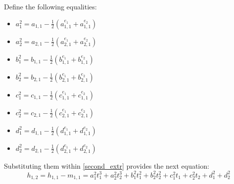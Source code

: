 Define the following equalities:

\begin{multicols}{2}
\begin{itemize}
\item $a_1^2 = a_{1,1} - \frac{1}{2} \left( a_{1,1}^{e_1} + a_{1,1}^{e_2}  \right)$
\item $a_2^2 = a_{2,1} - \frac{1}{2} \left( a_{2,1}^{e_1} + a_{2,1}^{e_2} \right) $
\item $b_1^2 = b_{1,1} - \frac{1}{2} \left( b_{1,1}^{e_1} + b_{1,1}^{e_2}  \right)$
\item $b_2^2 = b_{2,1} - \frac{1}{2} \left( b_{2,1}^{e_1} + b_{2,1}^{e_2}  \right) $
\item $ c_1^2 = c_{1,1} - \frac{1}{2} \left( c_{1,1}^{e_1} + c_{1,1}^{e_2}  \right)$
\item $c_2^2 =  c_{2,1} - \frac{1}{2} \left( c_{2,1}^{e_1} + c_{2,1}^{e_2}  \right)  $
\item $d_1^2 = d_{1,1} - \frac{1}{2} \left( d_{1,1}^{e_1} + d_{1,1}^{e_2}  \right)$
\item $d_2^2 = d_{2,1} - \frac{1}{2} \left( d_{2,1}^{e_1} + d_{2,1}^{e_2}  \right)$
\end{itemize}
\end{multicols}

Substituting them within \ref{second_extr} provides the next equation:
\begin{equation}
h_{1,2} = h_{1,1} - m_{1,1} = a_1^2 t_1^3 + a_2^2 t_2^3 + b_1^2 t_1^2 + b_2^2 t_2^2 + c_1^2 t_1 + c_2^2 t_2 + d_1^2 + d_2^2 
\end{equation}

